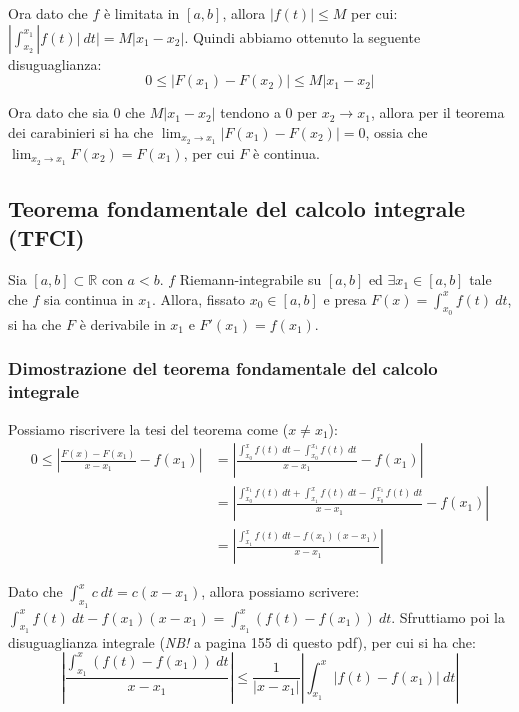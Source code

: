 \documentclass{article}
\begin{document}
\noindent Ora dato che $f$ è limitata in $[a, b]$, allora $|f(t)| \leq M$ per cui: $|\int_{x_2}^{x_1}|f(t)| \ dt| = M|x_1 - x_2|$. Quindi abbiamo ottenuto la seguente disuguaglianza:
\begin{equation*}
    0 \leq |F(x_1) - F(x_2)| \leq M|x_1 - x_2|
\end{equation*}
    
\noindent Ora dato che sia $0$ che $M|x_1 - x_2|$ tendono a $0$ per $x_2 \to x_1$, allora per il teorema dei carabinieri si ha che $\lim_{x_2 \to x_1}|F(x_1) - F(x_2)| = 0$, ossia che $\lim_{x_2 \to x_1} F(x_2) = F(x_1)$, per cui $F$ è continua.

\subsection{Teorema fondamentale del calcolo integrale (TFCI)}
Sia $[a, b] \subset \mathbb{R}$ con $a < b$. $f$ Riemann-integrabile su $[a, b]$ ed $\exists x_1 \in [a, b]$ tale che $f$ sia continua in $x_1$. Allora, fissato $x_0 \in [a, b]$ e presa $F(x) = \int_{x_0}^x f(t) \ dt$, si ha che $F$ è derivabile in $x_1$ e $F'(x_1) = f(x_1)$.

\subsubsection{Dimostrazione del teorema fondamentale del calcolo integrale}
Possiamo riscrivere la tesi del teorema come ($x \neq x_1$):
\begin{align*}
    0 \leq \left|\frac{F(x) - F(x_1)}{x - x_1} - f(x_1)\right| &= \left|\frac{\int_{x_0}^x f(t) \ dt - \int_{x_0}^{x_1} f(t) \ dt}{x - x_1} - f(x_1)\right| \\ 
    &= \left|\frac{\int_{x_0}^{x_1} f(t) \ dt + \int_{x_1}^x f(t) \ dt - \int_{x_0}^{x_1} f(t) \ dt}{x - x_1} - f(x_1)\right| \\
    &= \left|\frac{\int_{x_1}^x f(t) \ dt - f(x_1)(x - x_1)}{x - x_1}\right|
\end{align*}

\noindent Dato che $\int_{x_1}^x c \ dt = c(x - x_1)$, allora possiamo scrivere: $\int_{x_1}^x f(t) \ dt - f(x_1)(x - x_1) = \int_{x_1}^x (f(t) - f(x_1)) \ dt$. Sfruttiamo poi la disuguaglianza integrale (\textit{NB!} a pagina 155 di questo pdf), per cui si ha che:
\begin{equation*}
    \left|\frac{\int_{x_1}^x (f(t) - f(x_1)) \ dt}{x - x_1}\right| \leq \frac{1}{|x - x_1|} \left|\int_{x_1}^x |f(t) 
    - f(x_1)| \ dt \right|
\end{equation*}
\end{document}
